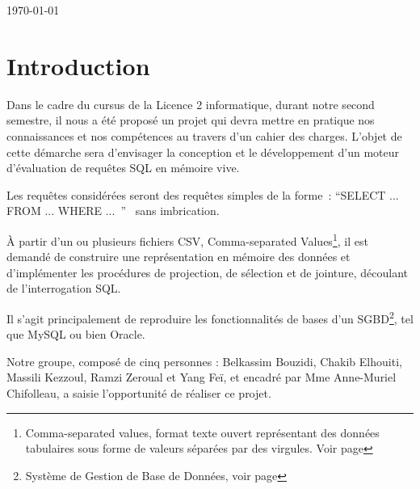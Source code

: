 \documentclass[oneside,13pt,a4paper]{report}
\begin{document}
\begin{titlepage}
	\par\vspace{1cm}

	\vfill

	{\large \today\par}
\end{titlepage}





\parskip=5pt
\chapter*{Introduction}

Dans le cadre du cursus de la Licence 2 informatique, durant notre second semestre, il nous a été proposé un projet qui devra mettre en pratique nos connaissances et nos compétences au travers d'un cahier des charges. L’objet de cette démarche sera d’envisager la conception et le développement d'un moteur d'évaluation de requêtes SQL en mémoire vive.

Les requêtes considérées seront des requêtes simples de la forme : \enquote{SELECT ... FROM ... WHERE ... }  sans imbrication.

À partir d’un ou plusieurs fichiers CSV, Comma-separated Values\footnote{Comma-separated values, format texte ouvert représentant des données tabulaires sous forme de valeurs séparées par des virgules. Voir page \pageref{csv}},
il est demandé de construire une représentation en mémoire des données et d'implémenter les procédures de projection, de sélection et de jointure, découlant de l'interrogation SQL.

Il s'agit principalement de reproduire les fonctionnalités de bases d'un SGBD\footnote{Système de Gestion de Base de Données, voir page \pageref{sgbd}}, tel que MySQL ou bien Oracle.

Notre groupe, composé de cinq personnes : Belkassim Bouzidi, Chakib Elhouiti, Massili Kezzoul, Ramzi Zeroual et Yang Feï, et encadré par Mme Anne-Muriel Chifolleau, a saisie l'opportunité de réaliser ce projet.
\end{document}
